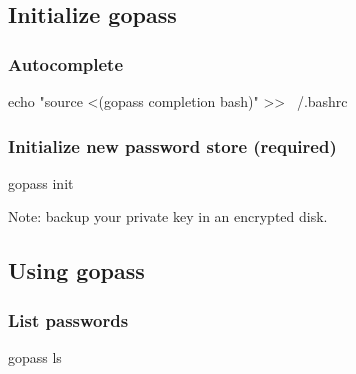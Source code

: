 \documentclass[9pt,english,a4paper,]{scrartcl}
\newenvironment{Shaded}{}{}
\newcommand{\BuiltInTok}[1]{#1}
\newcommand{\ExtensionTok}[1]{#1}
\newcommand{\NormalTok}[1]{#1}
\newcommand{\OperatorTok}[1]{\textcolor[rgb]{0.40,0.40,0.40}{#1}}
\newcommand{\StringTok}[1]{\textcolor[rgb]{0.25,0.44,0.63}{#1}}
\begin{document}
\begin{multicols}{3}
\hypertarget{initialize-gopass}{%
\subsection{Initialize gopass}\label{initialize-gopass}}

\hypertarget{autocomplete}{%
\subsubsection{Autocomplete}\label{autocomplete}}

\begin{Shaded}
\begin{Highlighting}[]
\BuiltInTok{echo} \StringTok{"source <(gopass completion bash)"} \OperatorTok{>>}\NormalTok{ ~/.bashrc}
\end{Highlighting}
\end{Shaded}

\hypertarget{initialize-new-password-store-required}{%
\subsubsection{Initialize new password store
(required)}\label{initialize-new-password-store-required}}

\begin{Shaded}
\begin{Highlighting}[]
\ExtensionTok{gopass}\NormalTok{ init}
\end{Highlighting}
\end{Shaded}

Note: backup your private key in an encrypted disk.

\hypertarget{using-gopass}{%
\subsection{Using gopass}\label{using-gopass}}

\hypertarget{list-passwords}{%
\subsubsection{List passwords}\label{list-passwords}}

\begin{Shaded}
\begin{Highlighting}[]
\ExtensionTok{gopass}\NormalTok{ ls}
\end{Highlighting}
\end{Shaded}

\hypertarget{creating-passwords}{%
}
\end{multicols}
\end{document}
